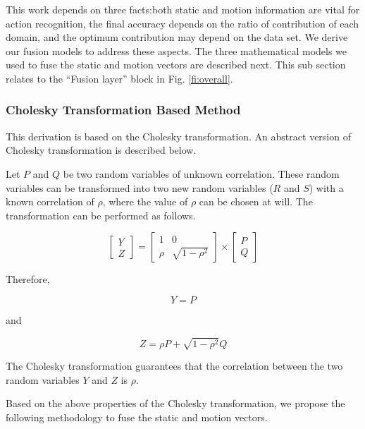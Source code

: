 
This work depends on three facts:both static and motion information
are vital for action recognition, the final accuracy depends on the ratio of contribution of each domain,
and the optimum contribution may depend on the data set. We derive our fusion models to address these aspects.
The three mathematical models we used
to fuse the static and motion vectors are described next. This sub section relates to the ``Fusion layer'' block in Fig. \ref{fi:overall}.

\subsubsection{Cholesky Transformation Based Method}

This derivation is based on the Cholesky transformation. An
abstract version of Cholesky transformation is described below.

Let $P$ and $Q$ be two random variables of unknown correlation. These random variables can be
transformed into two new random variables ($R$ and $S$) with a known correlation of $\rho$, where the
value of $\rho$ can be chosen at will. The transformation can be performed as follows.

\begin{equation}
\begin{bmatrix}
    Y     \\
    Z
\end{bmatrix}
=
\begin{bmatrix}
    1  & 0 \\
    \rho  & \sqrt{1-\rho^2}
\end{bmatrix}
\times
\begin{bmatrix}
    P     \\
    Q
\end{bmatrix}
\end{equation}

Therefore,

\begin{equation}
Y = P
\end{equation}

and

\begin{equation}
Z = \rho P + \sqrt{1-\rho^2}Q
\end{equation}

The Cholesky transformation guarantees that the correlation between the two random variables
$Y$ and $Z$ is $\rho$.

Based on the above properties of the Cholesky transformation, we propose the following methodology to fuse the static and
motion vectors.

